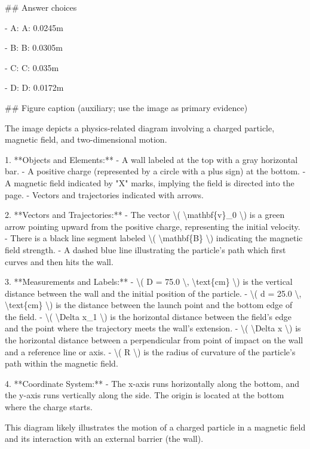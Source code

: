 \#\# Answer choices

- A: A: 0.0245m

- B: B: 0.0305m

- C: C: 0.035m

- D: D: 0.0172m

\#\# Figure caption (auxiliary; use the image as primary evidence)

The image depicts a physics-related diagram involving a charged particle, magnetic field, and two-dimensional motion.

1. **Objects and Elements:**
   - A wall labeled at the top with a gray horizontal bar.
   - A positive charge (represented by a circle with a plus sign) at the bottom.
   - A magnetic field indicated by "X" marks, implying the field is directed into the page.
   - Vectors and trajectories indicated with arrows.

2. **Vectors and Trajectories:**
   - The vector \textbackslash{}( \textbackslash{}mathbf\{v\}\_0 \textbackslash{}) is a green arrow pointing upward from the positive charge, representing the initial velocity.
   - There is a black line segment labeled \textbackslash{}( \textbackslash{}mathbf\{B\} \textbackslash{}) indicating the magnetic field strength.
   - A dashed blue line illustrating the particle's path which first curves and then hits the wall.

3. **Measurements and Labels:**
   - \textbackslash{}( D = 75.0 \textbackslash{}, \textbackslash{}text\{cm\} \textbackslash{}) is the vertical distance between the wall and the initial position of the particle.
   - \textbackslash{}( d = 25.0 \textbackslash{}, \textbackslash{}text\{cm\} \textbackslash{}) is the distance between the launch point and the bottom edge of the field.
   - \textbackslash{}( \textbackslash{}Delta x\_1 \textbackslash{}) is the horizontal distance between the field's edge and the point where the trajectory meets the wall's extension.
   - \textbackslash{}( \textbackslash{}Delta x \textbackslash{}) is the horizontal distance between a perpendicular from point of impact on the wall and a reference line or axis.
   - \textbackslash{}( R \textbackslash{}) is the radius of curvature of the particle’s path within the magnetic field.

4. **Coordinate System:**
   - The x-axis runs horizontally along the bottom, and the y-axis runs vertically along the side. The origin is located at the bottom where the charge starts.

This diagram likely illustrates the motion of a charged particle in a magnetic field and its interaction with an external barrier (the wall).

